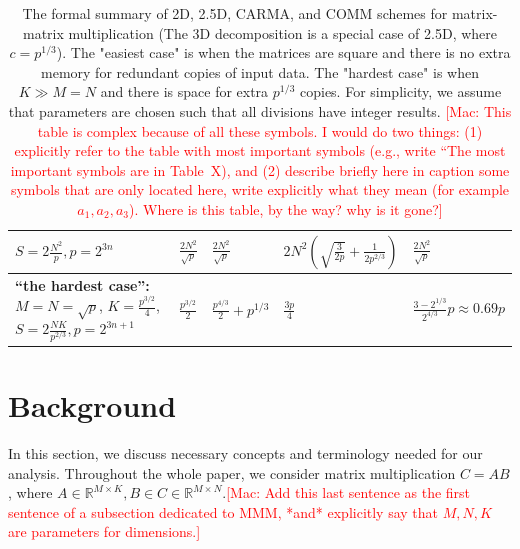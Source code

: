 \documentclass[sigplan,review,anonymous]{acmart}\settopmatter{printfolios=true,printccs=false,printacmref=false}
\newcommand\mac[1]{\textcolor{red}{[Mac: #1]}}
\begin{document}
\begin{table}
\begin{tabular}{lllll}
{$S = 2\frac{N^2}{p}, p=2^{3n}$}
&
$\frac{2N^2 }{\sqrt{p}}$
&
$\frac{2N^2 }{\sqrt{p}}$
&
$2N^2 \left(\sqrt{\frac{3}{2p}} + \frac{1}{2p^{2/3}} \right)$
& 
$\frac{2N^2 }{\sqrt{p}}$
%
\vspace{1.0em}
%
\\
%
\midrule
%
\makecell[l]{\textbf{``the hardest case'':}\\
$M = N = \sqrt{p}$,\\
$K = \frac{p^{3/2}}{4}$,\\
$S = 2\frac{NK}{p^{2/3}}, p=2^{3n + 1}$}
&
$\frac{p^{3/2}}{2}$
&
$\frac{p^{4/3}}{2} + p^{1/3}$
&
$\frac{3p}{4}$
& 
$\frac{3-2^{1/3}}{2^{4/3}}p \approx 0.69 p$
%
\\
%
\bottomrule
%
\end{tabular}
%
\caption{The formal summary of 2D,
2.5D, CARMA, and COMM schemes for matrix-matrix multiplication (The 3D 
decomposition is a special case of 2.5D, where $c=p^{1/3}$).
The "easiest case" is when the matrices are square and there is no extra
memory for redundant copies of input data. The "hardest case" is when $K \gg M
= N$ and there is space for extra $p^{1/3}$ copies.
For simplicity, we assume that parameters are chosen such that all divisions
have integer results. \mac{This table is complex because of all these symbols.
I would do two things: (1) explicitly refer to the table with most important
symbols (e.g., write ``The most important symbols are in Table~X), and (2)
describe briefly here in caption some symbols that are only located here, write
explicitly what they mean (for example $a_1, a_2, a_3$). Where is this table,
by the way? why is it gone?}}
%
\label{tab:summary}
\end{table}
%

\section{Background}

In this section, we discuss necessary concepts and terminology needed for our 
analysis. Throughout the whole paper, we consider matrix multiplication $C = 
AB$, where $A \in \mathbb{R}^{M \times K}, B \in  C \in \mathbb{R}^{M \times 
N}$.\mac{Add this last sentence as the first sentence of a subsection dedicated 
to MMM,
*and* explicitly say that $M,N,K$ are parameters for dimensions.}
\end{document}
